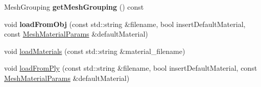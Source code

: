 \begin{DoxyCompactItemize}
\item 
\mbox{\label{class_mesh_base_abddf7bcbe3c82b31488665ddd8d9f488}} 
Mesh\+Grouping {\bfseries get\+Mesh\+Grouping} () const
\item 
\mbox{\label{class_mesh_base_a58df3c198977e2068ab6008f24ff2b46}} 
void {\bfseries load\+From\+Obj} (const std\+::string \&filename, bool insert\+Default\+Material, const \hyperlink{class_mesh_material_params}{Mesh\+Material\+Params} \&default\+Material)
\item 
void \hyperlink{class_mesh_base_a2abeac2d137eaea650ef5252cf81997a}{load\+Materials} (const std\+::string \&material\+\_\+filename)
\item 
void \hyperlink{class_mesh_base_a19e620f5497a82ac5508ee5fa2a8adce}{load\+From\+Ply} (const std\+::string \&filename, bool insert\+Default\+Material, const \hyperlink{class_mesh_material_params}{Mesh\+Material\+Params} \&default\+Material)
\end{DoxyCompactItemize}
